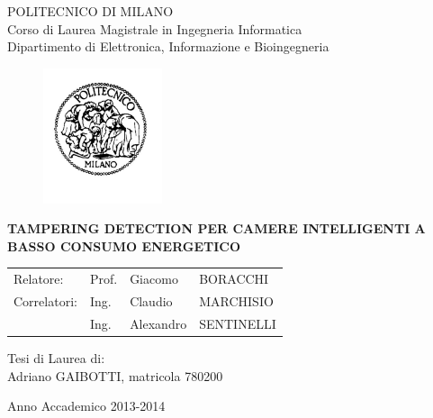 \thispagestyle{empty}
\vspace*{-1.5cm} \bfseries{
\begin{center}
  \large
  POLITECNICO DI MILANO\\
  \normalsize
  Corso di Laurea Magistrale in Ingegneria Informatica\\
  Dipartimento di Elettronica, Informazione e Bioingegneria\\
  \begin{figure}[htbp]
    \begin{center}
      \includegraphics[width=3.5cm]{./pictures/logopm}
    \end{center}
  \end{figure}
  \vspace*{0.3cm} \LARGE



  \textbf{TAMPERING DETECTION PER CAMERE INTELLIGENTI A BASSO CONSUMO ENERGETICO}\\



\end{center}
\vspace*{3.0cm} \large
\begin{flushleft}


\begin{tabular}{l l l l}
	Relatore: & Prof. & Giacomo & BORACCHI \\
	Correlatori: & Ing. & Claudio & MARCHISIO\\
	& Ing.& Alexandro & SENTINELLI 
\end{tabular}

  

\end{flushleft}
\vspace*{1.0cm}
\begin{flushright}


  Tesi di Laurea di:\\ Adriano GAIBOTTI, matricola 780200 \\ 
		       


\end{flushright}
\vspace*{0.5cm}
\begin{center}



  Anno Accademico 2013-2014
\end{center} \clearpage
}
